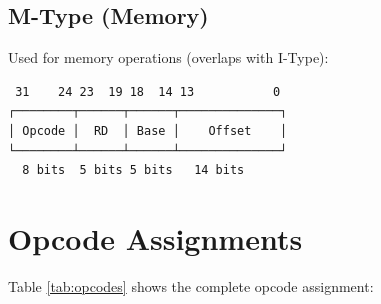\documentclass[12pt,a4paper,oneside]{book}
\begin{document}
\subsection{M-Type (Memory)}

Used for memory operations (overlaps with I-Type):

\begin{verbatim}
 31    24 23  19 18  14 13           0
┌────────┬──────┬──────┬──────────────┐
│ Opcode │  RD  │ Base │    Offset    │
└────────┴──────┴──────┴──────────────┘
  8 bits  5 bits 5 bits   14 bits
\end{verbatim}

\section{Opcode Assignments}

Table \ref{tab:opcodes} shows the complete opcode assignment:
\end{document}
